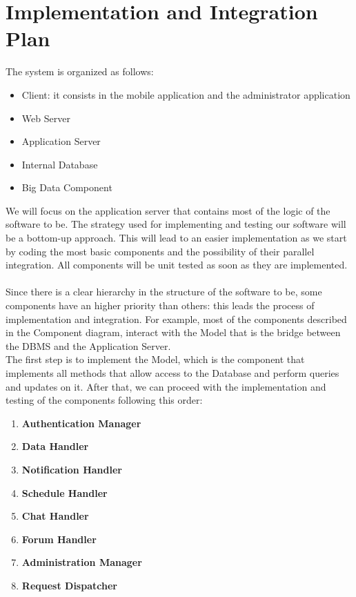 \documentclass[10pt]{report}
\begin{document}
\section{Implementation and Integration Plan}
The system is organized as follows:
\begin{itemize}
    \item Client: it consists in the mobile application and the administrator application
    \item Web Server
    \item Application Server
    \item Internal Database
    \item Big Data Component
\end{itemize}
We will focus on the application server that contains most of the logic of the software to be. 
The strategy used for implementing and testing our software will be a bottom-up approach.
This will lead to an easier implementation as we start by coding the most basic components
and the possibility of their parallel integration.
All components will be unit tested as soon as they are implemented.\\ \\
Since there is a clear hierarchy in the structure of the software to be, some components have
an higher priority than others: this leads the process of implementation and integration.
For example, most of the components described in the Component diagram, interact
with the Model that is the bridge between the DBMS and the
Application Server.\\
The first step is to implement the Model, which is the
component that implements all methods that allow access to the Database and
perform queries and updates on it.
After that, we can proceed with the implementation and testing of the components following this order:

\begin{enumerate}
    \item \textbf{Authentication Manager}
    \item \textbf{Data Handler}
    \item \textbf{Notification Handler}
    \item \textbf{Schedule Handler}
    \item \textbf{Chat Handler}
    \item \textbf{Forum Handler}
    \item \textbf{Administration Manager}
    \item \textbf{Request Dispatcher}
\end{enumerate}
\end{document}
